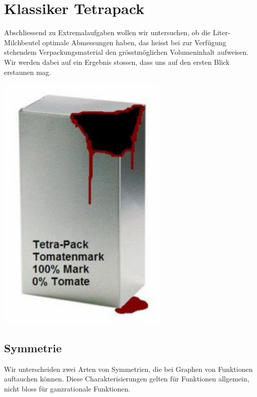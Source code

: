 \documentclass[%
11pt,%
twoside,%
titlepage,%
german,%
headsepline%
]{scrartcl}
\begin{document}
\newpage

\appendix

\section{Klassiker Tetrapack}

\begin{ueb}
Abschliessend
zu Extremalaufgaben wollen wir untersuchen, ob die Liter-Milchbeutel optimale Abmessungen haben, das heisst bei zur Verf\"ugung stehendem Verpackungsmaterial den gr\"osstm\"oglichen Volumeninhalt aufweisen. Wir werden dabei auf ein Ergebnis stossen, dass uns auf den ersten Blick erstaunen mag.

\begin{center}
\includegraphics[width=0.618\textwidth]{pictures/Tetrapack}
\end{center}
\end{ueb}

\newpage

\subsection{Symmetrie}
Wir unterscheiden zwei Arten von Symmetrien, die bei Graphen von Funktionen auftauchen k\"onnen. Diese Charakterisierungen gelten f\"ur Funktionen allgemein, nicht bloss f\"ur ganzrationale Funktionen.
\end{document}
